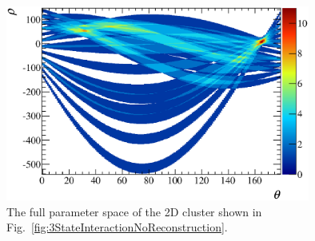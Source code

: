 \begin{figure}
  \centering
  \includegraphics[width=10cm]{images/ecal_hough_transform/FullParameterSpace_3StateInteraction.eps}
  \caption{The full parameter space of the 2D cluster shown in Fig.~\ref{fig:3StateInteractionNoReconstruction}.}
  \label{fig:FullParameterSpace3StateInteraction}
\end{figure}


